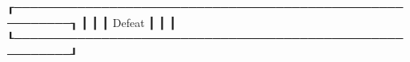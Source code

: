 ┎─────────────────────────────────────────────────────────┒
┃                                                         ┃
┃                         Defeat                          ┃
┃                                                         ┃
┖─────────────────────────────────────────────────────────┚